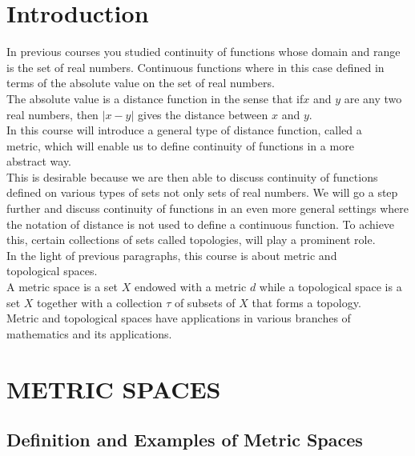 \documentclass[11pt,a4paper]{article}
\theoremstyle{definition}
\begin{document}
\section*{Introduction}
In previous courses you studied continuity of functions whose domain and range is the set of real numbers. Continuous functions where in this case defined in terms of the absolute value on the set of real numbers.\\ The absolute value is a distance function in the sense that if$ x$ and $y$ are any two real numbers, then $|x-y|$ gives the distance between $x$ and $y$.\\ In this course will introduce a general type of distance function, called a\\ metric, which will enable us to define continuity of functions in a more\\ abstract way.\\ This is desirable because we are then able to discuss continuity of functions defined on various types of sets not only sets of real numbers. We will go a step further and discuss continuity of functions in an even more general settings where the notation of distance is not used to define a continuous function. To achieve this, certain collections of sets called topologies, will play a prominent role.\\ In the light of previous paragraphs, this course is about metric and\\ topological spaces.\\ A metric space is a set $X$ endowed with a metric $d$ while a topological space is a set $X$ together with a collection $\tau$ of subsets of $X$ that forms a topology.\\Metric and topological spaces have applications in various branches of\\ mathematics and its applications.\\












\pagebreak
\section{METRIC SPACES}

\subsection{Definition and Examples of Metric Spaces}
\end{document}
